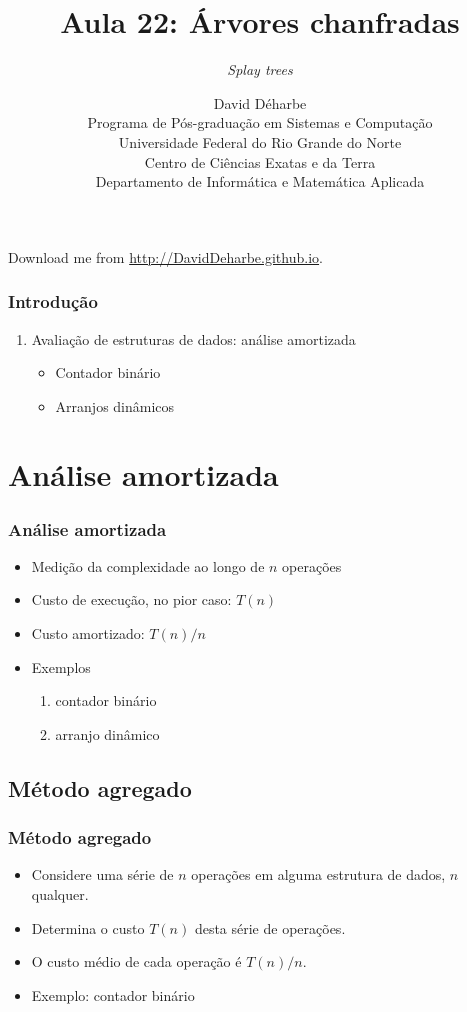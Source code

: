 \documentclass{beamer}
\title{Aula 22: Árvores chanfradas}
\subtitle{\textit{Splay trees\/}}
\author{David Déharbe \\
  Programa de Pós-graduação em Sistemas e Computação \\
  Universidade Federal do Rio Grande do Norte \\
  Centro de Ciências Exatas e da Terra \\
  Departamento de Informática e Matemática Aplicada}
\date{}
\begin{document}

\begin{frame}
  \titlepage
  Download me from \url{http://DavidDeharbe.github.io}.
\end{frame}

\begin{frame}
  \frametitle{Introdução}
  \tableofcontents

  \begin{enumerate}
    \item Avaliação de estruturas de dados: análise amortizada
      \begin{itemize}
        \item Contador binário
        \item Arranjos dinâmicos
      \end{itemize}
  \end{enumerate}

\end{frame}

\section{Análise amortizada}

\begin{frame}
\frametitle{Análise amortizada}

\begin{itemize}
\item Medição da complexidade ao longo de $n$ operações
\item Custo de execução, no pior caso: $T(n)$
\item Custo amortizado: $T(n)/n$
\item Exemplos
\begin{enumerate}
  \item contador binário
  \item arranjo dinâmico
\end{enumerate}
\end{itemize}
\end{frame}

\subsection{Método agregado}

\begin{frame}

\frametitle{Método agregado}

\begin{itemize}
\item Considere uma série de $n$ operações em alguma estrutura de dados, $n$
  qualquer.

\item Determina o custo $T(n)$ desta série de operações.

\item O custo médio de cada operação é $T(n)/n$.

\item Exemplo: contador binário
\end{itemize}

\end{frame}
\end{document}
